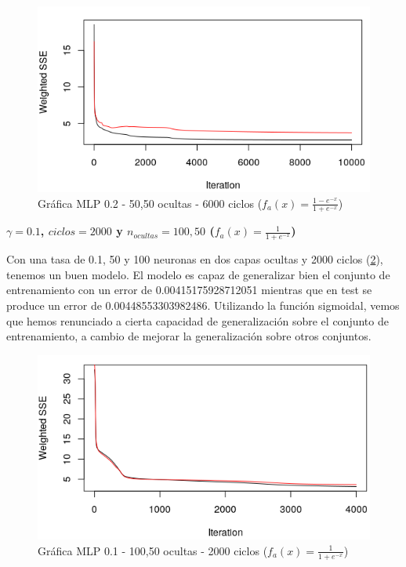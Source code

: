 \documentclass[11pt,spanish,listoffigures,listoftables]{workluis}
\begin{document}
\begin{figure}[H]
\centering
\includegraphics[scale=0.5]{500810000tan}
\caption{Gráfica MLP 0.2 - 50,50 ocultas - 6000 ciclos ($f_{a}(x) = \frac{1-e^{-x}}{1+e^{-x}}$)}\label{fig:500810000tan}
\end{figure}

\par \textbf{$\gamma = 0.1$, $ciclos = 2000$ y $n_{ocultas} = 100, 50$ ($f_{a}(x) = \frac{1}{1+e^{-x}}$)}

\par Con una tasa de 0.1, 50 y 100 neuronas en dos capas ocultas y 2000 ciclos (\ref{fig:10050012000sig}), tenemos un buen modelo. El modelo es capaz de generalizar bien el conjunto de entrenamiento con un error de 0.00415175928712051 mientras que en test se produce un error de 0.00448553303982486. Utilizando la función sigmoidal, vemos que hemos renunciado a cierta capacidad de generalización sobre el conjunto de entrenamiento, a cambio de mejorar la generalización sobre otros conjuntos.

\begin{figure}[H]
\centering
\includegraphics[scale=0.5]{10050012000sig}
\caption{Gráfica MLP 0.1 - 100,50 ocultas - 2000 ciclos ($f_{a}(x) = \frac{1}{1+e^{-x}}$)}\label{fig:10050012000sig}
\end{figure}
\end{document}
